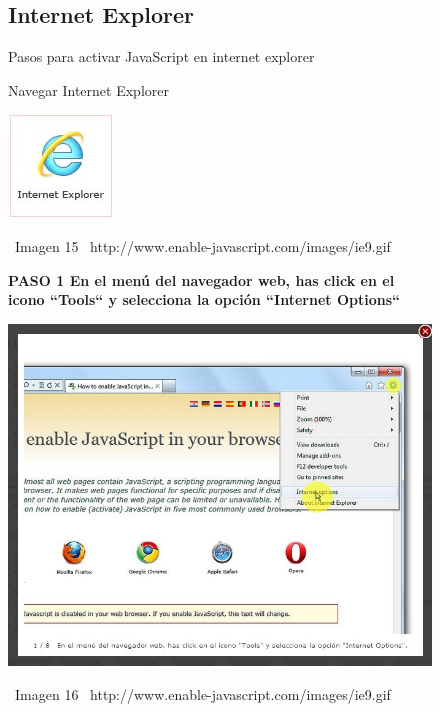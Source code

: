 \documentclass[11pt]{article} %
\begin{document}
\begin{figure}
\subsection{Internet Explorer}
Pasos para activar JavaScript en internet explorer
\begin{center}
\begin{center}
Navegar Internet Explorer

\end{center}
\begin{center}
\includegraphics[height=3 cm, width=3 cm] {imagenes/explorer.jpg}
\end{center}

\ Imagen 15
\ {http://www.enable-javascript.com/images/ie9.gif }
\newline
\begin{center}

\bf PASO 1
En el menú del navegador web, has click en el icono ``Tools`` y selecciona la opción ``Internet Options``
\\
\end{center}
\begin{center}
\includegraphics[height=8 cm, width=8 cm] {imagenes/explorer 01.jpg}
\end{center}

\ Imagen 16
\ {http://www.enable-javascript.com/images/ie9.gif }

\end{center}
\end{figure}
\end{document}
